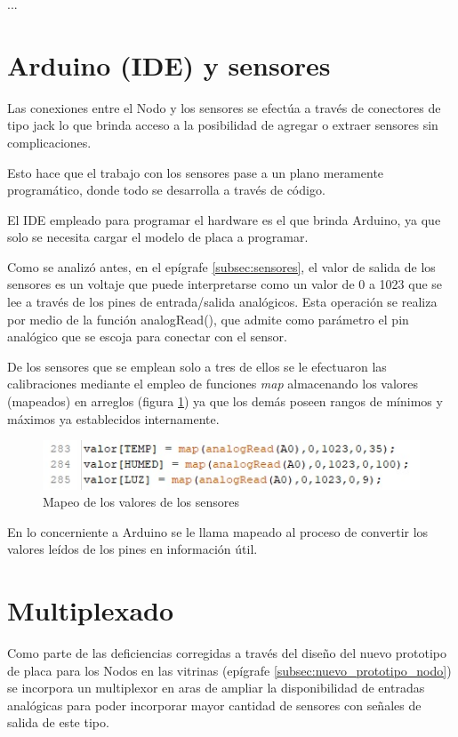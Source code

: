 ...

\section{Arduino (IDE) y sensores}

Las conexiones entre el Nodo y los sensores se efectúa a través de conectores de tipo jack lo que brinda acceso a la posibilidad de agregar o extraer sensores sin complicaciones.

Esto hace que el trabajo con los sensores pase a un plano meramente programático, donde todo se desarrolla a través de código.

El IDE empleado para programar el hardware es el que brinda Arduino, ya que solo se necesita cargar el modelo de placa a programar.

Como se analizó antes, en el epígrafe \ref{subsec:sensores}, el valor de salida de los sensores es un voltaje que puede interpretarse como un valor de 0 a 1023 que se lee a través de los pines de entrada/salida analógicos.
Esta operación se realiza por medio de la función analogRead(), que admite como parámetro el pin analógico que se escoja para conectar con el sensor.

De los sensores que se emplean solo a tres de ellos se le efectuaron las calibraciones mediante el empleo de funciones \textit{map} almacenando los valores (mapeados) en arreglos (figura \ref{imag:mapeo_sensores}) ya que los demás poseen rangos de mínimos y máximos ya establecidos internamente.

\begin{figure}[H]
    \centering
    \includegraphics{imagenes/mapeado.jpg}
    \caption{Mapeo de los valores de los sensores}
    \label{imag:mapeo_sensores}
\end{figure}

En lo concerniente a Arduino se le llama mapeado al proceso de convertir los valores leídos de los pines en información útil. 

\section{Multiplexado}

Como parte de las deficiencias corregidas a través del diseño del nuevo prototipo de placa para los Nodos en las vitrinas (epígrafe \ref{subsec:nuevo_prototipo_nodo}) se incorpora un multiplexor en aras de ampliar la disponibilidad
de entradas analógicas para poder incorporar mayor cantidad de sensores con señales de salida de este tipo.

